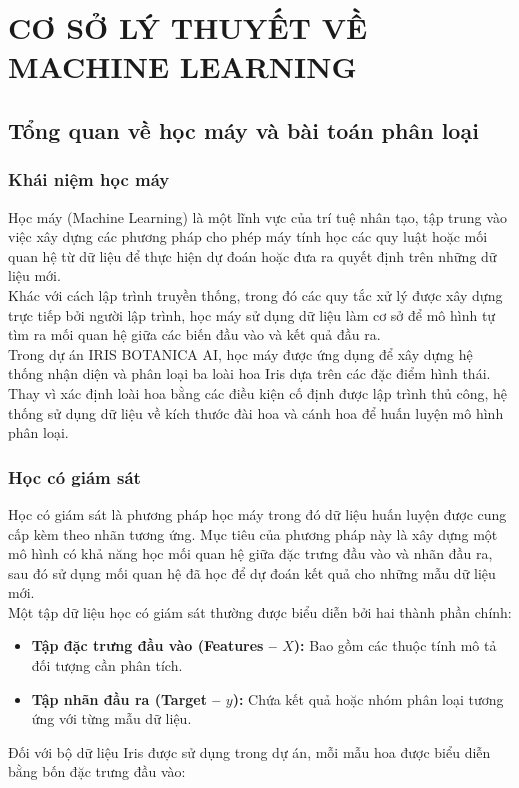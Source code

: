 \documentclass[14pt]{extarticle}
\begin{document}
	\newpage
	
	
	
	
	\section{CƠ SỞ LÝ THUYẾT VỀ MACHINE LEARNING}
	\subsection{Tổng quan về học máy và bài toán phân loại }
		\subsubsection{Khái niệm học máy }
	\noindent Học máy (Machine Learning) là một lĩnh vực của trí tuệ nhân tạo, tập trung vào việc xây dựng các phương pháp cho phép máy tính học các quy luật hoặc mối quan hệ từ dữ liệu để thực hiện dự đoán hoặc đưa ra quyết định trên những dữ liệu mới.\\
	
	\noindent  Khác với cách lập trình truyền thống, trong đó các quy tắc xử lý được xây dựng trực tiếp bởi người lập trình, học máy sử dụng dữ liệu làm cơ sở để mô hình tự tìm ra mối quan hệ giữa các biến đầu vào và kết quả đầu ra.\\
	
	\noindent Trong dự án IRIS BOTANICA AI, học máy được ứng dụng để xây dựng hệ thống nhận diện và phân loại ba loài hoa Iris dựa trên các đặc điểm hình thái. Thay vì xác định loài hoa bằng các điều kiện cố định được lập trình thủ công, hệ thống sử dụng dữ liệu về kích thước đài hoa và cánh hoa để huấn luyện mô hình phân loại.\\

	
	\subsubsection{Học có giám sát}
	
	\noindent Học có giám sát là phương pháp học máy trong đó dữ liệu huấn luyện được cung cấp kèm theo nhãn tương ứng. Mục tiêu của phương pháp này là xây dựng một mô hình có khả năng học mối quan hệ giữa đặc trưng đầu vào và nhãn đầu ra, sau đó sử dụng mối quan hệ đã học để dự đoán kết quả cho những mẫu dữ liệu mới.\\
	\newpage
	\noindent Một tập dữ liệu học có giám sát thường được biểu diễn bởi hai thành phần chính:
	
	\begin{itemize}
		\item \textbf{Tập đặc trưng đầu vào (Features -- $X$):} Bao gồm các thuộc tính mô tả đối tượng cần phân tích.
		
		\item \textbf{Tập nhãn đầu ra (Target -- $y$):} Chứa kết quả hoặc nhóm phân loại tương ứng với từng mẫu dữ liệu.
	\end{itemize}
	\noindent Đối với bộ dữ liệu Iris được sử dụng trong dự án, mỗi mẫu hoa được biểu diễn bằng bốn đặc trưng đầu vào:
	
\end{document}
